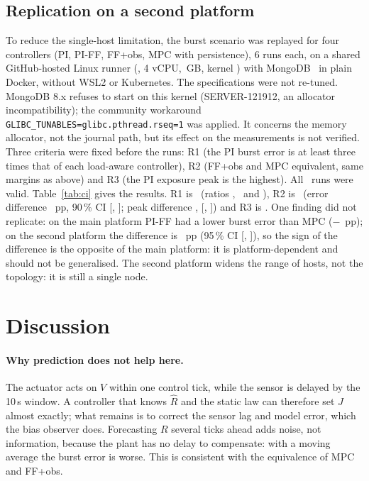 \documentclass[smallextended]{svjour3}
\begin{document}
\subsection{Replication on a second platform}\label{sec:replication}
To reduce the single-host limitation, the burst scenario was replayed for four controllers (PI, PI-FF, FF+obs, MPC with persistence), 6 runs each, on a shared GitHub-hosted Linux runner
(\CICpu, 4 vCPU, \CIRam\,GB, kernel \CIKernel) with MongoDB \CIImage\ in plain Docker, without WSL2 or Kubernetes. The specifications were not re-tuned. MongoDB 8.x refuses to start on this kernel
(SERVER-121912, an allocator incompatibility); the community workaround \texttt{GLIBC\_TUNABLES=glibc.pthread.rseq=1} was applied. It concerns the memory allocator, not the journal path, but its effect on the
measurements is not verified. Three criteria were fixed before the runs: R1 (the PI burst error is at least three times that of each load-aware controller), R2 (FF+obs and MPC equivalent, same margins as above) and R3
(the PI exposure peak is the highest). All \CIN\ runs were valid.
Table~\ref{tab:ci} gives the results. R1 is \CIRone\ (ratios \CIRatioPIFF, \CIRatioFFO\ and \CIRatioMPCP), R2 is \CIRtwo\ (error difference \CIeqMaeD\ pp, 90\,\% CI [\CIeqMaeLo, \CIeqMaeHi]; peak difference
\CIeqPeakD, [\CIeqPeakLo, \CIeqPeakHi]) and R3 is \CIRthree. One finding did not replicate: on the main platform PI-FF had a lower burst error than MPC ($-$\cAMaePIFFMPCPS\ pp); on the second platform the difference is
\CIPIFFvsMPCD\ pp (95\,\% CI [\CIPIFFvsMPCLo, \CIPIFFvsMPCHi]), so the sign of the difference is the opposite of the main platform: it is platform-dependent and should not be generalised.
The second platform widens the range of hosts, not the topology: it is still a single node.


\section{Discussion}\label{sec:discussion}
\paragraph{Why prediction does not help here.}
The actuator acts on $V$ within one control tick, while the sensor is delayed by the 10\,s window. A controller that knows $\hat R$ and the static law can therefore set $J$ almost
exactly; what remains is to correct the sensor lag and model error, which the bias observer does. Forecasting $R$ several ticks ahead adds noise, not information, because the plant has no
delay to compensate: with a moving average the burst error is worse. This is consistent with the equivalence of MPC and FF+obs.
\end{document}

